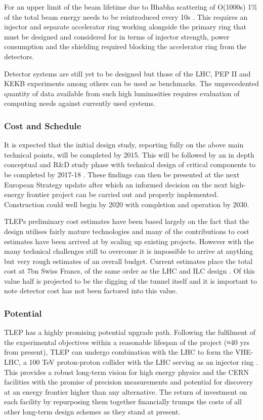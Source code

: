 For an upper limit of the beam lifetime due to Bhabha scattering of O(1000s) 1\% of the total beam energy needs to be reintroduced every 10s \cite{TLEP:Janot} \cite{TLEP:CERNOverview}. This requires an injector and separate accelerator ring working alongside the primary ring that must be designed and considered for in terms of injector strength, power consumption and the shielding required blocking the accelerator ring from the detectors. 

Detector systems are still yet to be designed but those of the LHC, PEP II and KEKB experiments among others can be used as benchmarks. The unprecedented quantity of data available from such high luminosities requires evaluation of computing needs against currently used systems. 

\subsubsection{Cost and Schedule}

It is expected that the initial design study, reporting fully on the above main technical points, will be completed by 2015. This will be followed by an in depth conceptual and R\&D study phase with technical design of critical components to be completed by 2017-18 \cite{TLEP:CERNOverview}. These findings can then be presented at the next European Strategy update after which an informed decision on the next high-energy frontier project can be carried out and properly implemented. Construction could well begin by 2020 with completion and operation by 2030. 

TLEPs preliminary cost estimates have been based largely on the fact that the design utilises fairly mature technologies and many of the contributions to cost estimates have been arrived at by scaling up existing projects. However with the many technical challenges still to overcome it is impossible to arrive at anything but very rough estimates of an overall budget. Current estimates place the total cost at 7bn Swiss Francs, of the same order as the LHC and ILC design \cite{TLEP:Janot}. Of this value half is projected to be the digging of the tunnel itself and it is important to note detector cost has not been factored into this value.

\subsubsection{Potential}

TLEP has a highly promising potential upgrade path. Following the fulfilment of the experimental objectives within a reasonable lifespan of the project (≈40 yrs from present), TLEP can undergo combination with the LHC to form the VHE-LHC, a 100 TeV proton-proton collider with the LHC serving as an injector ring \cite{TLEP:Janot}. This provides a robust long-term vision for high energy physics and the CERN facilities with the promise of precision measurements and potential for discovery at an energy frontier higher than any alternative. The return of investment on each facility by repurposing them together financially trumps the costs of all other long-term design schemes as they stand at present.
